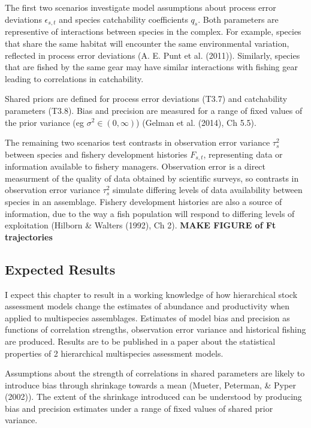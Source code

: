 \documentclass[12pt,]{scrartcl}
\begin{document}
The first two scenarios investigate model assumptions about process
error deviations \(\epsilon_{s,t}\) and species catchability
coefficients \(q_s\). Both parameters are representive of interactions
between species in the complex. For example, species that share the same
habitat will encounter the same environmental variation, reflected in
process error deviations (A. E. Punt et al. (2011)). Similarly, species
that are fished by the same gear may have similar interactions with
fishing gear leading to correlations in catchability.

Shared priors are defined for process error deviations (T3.7) and
catchability parameters (T3.8). Bias and precision are measured for a
range of fixed values of the prior variance (eg
\(\sigma^2 \in (0,\infty)\)) (Gelman et al. (2014), Ch 5.5).

The remaining two scenarios test contrasts in observation error variance
\(\tau_s^2\) between species and fishery development histories
\(F_{s,t}\), representing data or information available to fishery
managers. Observation error is a direct measurment of the quality of
data obtained by scientific surveys, so contrasts in observation error
variance \(\tau_s^2\) simulate differing levels of data availability
between species in an assemblage. Fishery development histories are also
a source of information, due to the way a fish population will respond
to differing levels of exploitation (Hilborn \& Walters (1992), Ch 2).
\textbf{MAKE FIGURE of Ft trajectories}

\subsection{Expected Results}\label{expected-results}

I expect this chapter to result in a working knowledge of how
hierarchical stock assessment models change the estimates of abundance
and productivity when applied to multispecies assemblages. Estimates of
model bias and precision as functions of correlation strengths,
observation error variance and historical fishing are produced. Results
are to be published in a paper about the statistical properties of 2
hierarchical multispecies assessment models.

Assumptions about the strength of correlations in shared parameters are
likely to introduce bias through shrinkage towards a mean (Mueter,
Peterman, \& Pyper (2002)). The extent of the shrinkage introduced can
be understood by producing bias and precision estimates under a range of
fixed values of shared prior variance.
\end{document}
